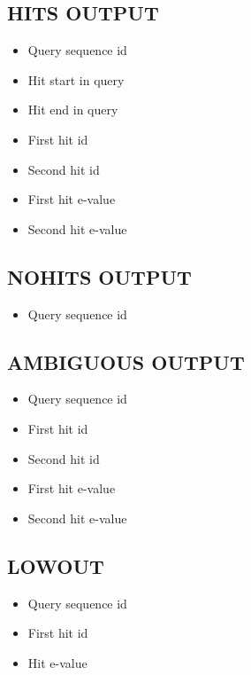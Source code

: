 \documentclass[letterpaper,10pt,english]{sphinxmanual}
\begin{document}
\subsection{HITS OUTPUT}
\label{defs:hitsout}\label{defs:hits-output}\begin{itemize}
\item {} 
Query sequence id

\item {} 
Hit start in query

\item {} 
Hit end in query

\item {} 
First hit id

\item {} 
Second hit id

\item {} 
First hit e-value

\item {} 
Second hit e-value

\end{itemize}


\subsection{NOHITS OUTPUT}
\label{defs:nohitsout}\label{defs:nohits-output}\begin{itemize}
\item {} 
Query sequence id

\end{itemize}


\subsection{AMBIGUOUS OUTPUT}
\label{defs:ambiguousout}\label{defs:ambiguous-output}\begin{itemize}
\item {} 
Query sequence id

\item {} 
First hit id

\item {} 
Second hit id

\item {} 
First hit e-value

\item {} 
Second hit e-value

\end{itemize}


\subsection{LOWOUT}
\label{defs:id10}\label{defs:lowout}\begin{itemize}
\item {} 
Query sequence id

\item {} 
First hit id

\item {} 
Hit e-value

\end{itemize}
\end{document}
